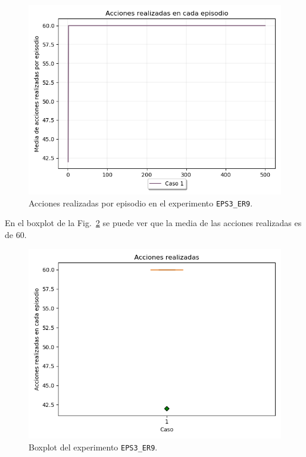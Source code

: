 \begin{figure}
    \centering
    \includegraphics[scale=0.4]{cap5_experimentacion/images/dim5_lr0.01_ep0.8_acciones.png}
        \caption{Acciones realizadas por episodio en el experimento \texttt{EPS3\_ER9}.}
    \label{fig:dim5_lr0.01_ep0.8_acciones}
\end{figure}

En el boxplot de la Fig.~\ref{fig:dim5_lr0.01_ep0.8_boxplot} se puede ver que la media de las acciones realizadas es de 60.

\begin{figure}
    \centering
    \includegraphics[scale=0.4]{cap5_experimentacion/images/dim5_lr0.01_ep0.8_boxplot.png}
    \caption{Boxplot del experimento \texttt{EPS3\_ER9}.}
    \label{fig:dim5_lr0.01_ep0.8_boxplot}
\end{figure}

